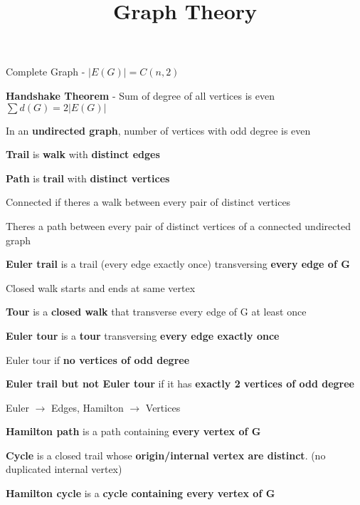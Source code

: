 \documentclass[12pt]{article}
\title{\textbf{Graph Theory}}
\date{}
\begin{document}
\maketitle

\begin{spacing}{1.5}

Complete Graph - $|E(G)| = C(n, 2)$

\textbf{Handshake Theorem} - Sum of degree of all vertices is even $\sum d(G) = 2|E(G)|$

In an \textbf{undirected graph}, number of vertices with odd degree is even

\textbf{Trail} is \textbf{walk} with \textbf{distinct edges}

\textbf{Path} is \textbf{trail} with \textbf{distinct vertices}

Connected if theres a walk between every pair of distinct vertices

Theres a path between every pair of distinct vertices of a connected undirected graph

\textbf{Euler trail} is a trail (every edge exactly once) transversing \textbf{every edge of G}

Closed walk starts and ends at same vertex

\textbf{Tour} is a \textbf{closed walk} that transverse every edge of G at least once

\textbf{Euler tour} is a \textbf{tour} transversing \textbf{every edge exactly once}

Euler tour if \textbf{no vertices of odd degree}

\textbf{Euler trail but not Euler tour} if it has \textbf{exactly 2 vertices of odd degree}

Euler $\rightarrow$ Edges, Hamilton $\rightarrow$ Vertices

\textbf{Hamilton path} is a path containing \textbf{every vertex of G}

\textbf{Cycle} is a closed trail whose \textbf{origin/internal vertex are distinct}. (no duplicated internal vertex)

\textbf{Hamilton cycle} is a \textbf{cycle containing every vertex of G}


\end{spacing}
\end{document}
